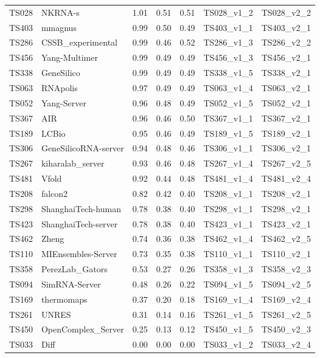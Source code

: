 \begin{table}[ht]
{\begin{tabular}{llrrrll}
TS028 & NKRNA-s & 1.01 & 0.51 & 0.51 & TS028\_v1\_2 & TS028\_v2\_2 \\ 
TS403 & mmagnus & 0.99 & 0.50 & 0.49 & TS403\_v1\_1 & TS403\_v2\_1 \\ 
TS286 & CSSB\_experimental & 0.99 & 0.46 & 0.52 & TS286\_v1\_3 & TS286\_v2\_2 \\ 
TS456 & Yang-Multimer & 0.99 & 0.49 & 0.49 & TS456\_v1\_3 & TS456\_v2\_1 \\ 
TS338 & GeneSilico & 0.99 & 0.49 & 0.49 & TS338\_v1\_5 & TS338\_v2\_1 \\ 
TS063 & RNApolis & 0.97 & 0.49 & 0.49 & TS063\_v1\_4 & TS063\_v2\_1 \\ 
TS052 & Yang-Server & 0.96 & 0.48 & 0.49 & TS052\_v1\_5 & TS052\_v2\_1 \\ 
TS367 & AIR & 0.96 & 0.46 & 0.50 & TS367\_v1\_1 & TS367\_v2\_1 \\ 
TS189 & LCBio & 0.95 & 0.46 & 0.49 & TS189\_v1\_5 & TS189\_v2\_1 \\ 
TS306 & GeneSilicoRNA-server & 0.94 & 0.48 & 0.46 & TS306\_v1\_1 & TS306\_v2\_1 \\ 
TS267 & kiharalab\_server & 0.93 & 0.46 & 0.48 & TS267\_v1\_4 & TS267\_v2\_5 \\ 
TS481 & Vfold & 0.92 & 0.44 & 0.48 & TS481\_v1\_4 & TS481\_v2\_4 \\ 
TS208 & falcon2 & 0.82 & 0.42 & 0.40 & TS208\_v1\_1 & TS208\_v2\_1 \\ 
TS298 & ShanghaiTech-human & 0.78 & 0.38 & 0.40 & TS298\_v1\_1 & TS298\_v2\_1 \\ 
TS423 & ShanghaiTech-server & 0.78 & 0.38 & 0.40 & TS423\_v1\_1 & TS423\_v2\_1 \\ 
TS462 & Zheng & 0.74 & 0.36 & 0.38 & TS462\_v1\_4 & TS462\_v2\_5 \\ 
TS110 & MIEnsembles-Server & 0.73 & 0.35 & 0.38 & TS110\_v1\_1 & TS110\_v2\_1 \\ 
TS358 & PerezLab\_Gators & 0.53 & 0.27 & 0.26 & TS358\_v1\_3 & TS358\_v2\_3 \\ 
TS094 & SimRNA-Server & 0.48 & 0.26 & 0.22 & TS094\_v1\_5 & TS094\_v2\_5 \\ 
TS169 & thermomaps & 0.37 & 0.20 & 0.18 & TS169\_v1\_4 & TS169\_v2\_4 \\ 
TS261 & UNRES & 0.31 & 0.14 & 0.16 & TS261\_v1\_5 & TS261\_v2\_5 \\ 
TS450 & OpenComplex\_Server & 0.25 & 0.13 & 0.12 & TS450\_v1\_5 & TS450\_v2\_3 \\ 
TS033 & Diff & 0.00 & 0.00 & 0.00 & TS033\_v1\_2 & TS033\_v2\_4 \\ 
\bottomrule
\end{tabular}%
}
\end{table}
